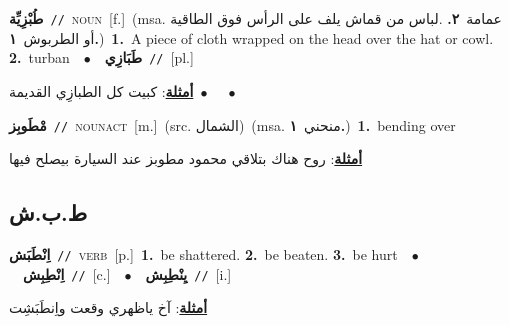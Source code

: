 \documentclass[10pt,a4paper,twoside]{article} %
\begin{document}
\begin{multicols}{2}
{\setlength\topsep{0pt}\textbf{\foreignlanguage{arabic}{طُبْزِيِّة}}\ {\color{gray}\texttt{//}\color{black}}\ \textsc{noun}\ [f.]\ \color{gray}(msa. \foreignlanguage{arabic}{عمامة}~\foreignlanguage{arabic}{\textbf{٢.}}  .\foreignlanguage{arabic}{لباس من قماش يلف على الرأس فوق الطاقية أو الطربوش}~\foreignlanguage{arabic}{\textbf{١.}})\color{black}\ \textbf{1.}~A piece of cloth wrapped on the head over the hat or cowl.  \textbf{2.}~turban\ \ $\bullet$\ \ \setlength\topsep{0pt}\textbf{\foreignlanguage{arabic}{طَبَازِي}}\ {\color{gray}\texttt{//}\color{black}}\ [pl.]\  \begin{flushright}\color{gray}\foreignlanguage{arabic}{\textbf{\underline{\foreignlanguage{arabic}{أمثلة}}}: كبيت كل الطبازِي القديمة\ $\bullet$\ \  \ $\bullet$\ \  }\end{flushright}\color{black}} \vspace{2mm}

{\setlength\topsep{0pt}\textbf{\foreignlanguage{arabic}{مْطَوبِز}}\ {\color{gray}\texttt{//}\color{black}}\ \textsc{noun\textunderscore act}\ [m.]\ (src. \color{gray}\foreignlanguage{arabic}{الشمال}\color{black})\ \color{gray}(msa. \foreignlanguage{arabic}{منحني}~\foreignlanguage{arabic}{\textbf{١.}})\color{black}\ \textbf{1.}~bending over\  \begin{flushright}\color{gray}\foreignlanguage{arabic}{\textbf{\underline{\foreignlanguage{arabic}{أمثلة}}}: روح هناك بتلاقي محمود مطوبز عند السيارة بيصلح فيها}\end{flushright}\color{black}} \vspace{2mm}

\vspace{-3mm}
\subsection*{\color{blue}\foreignlanguage{arabic}{ط.ب.ش}\color{blue}{}} 

{\setlength\topsep{0pt}\textbf{\foreignlanguage{arabic}{اِنْطَبَش}}\ {\color{gray}\texttt{//}\color{black}}\ \textsc{verb}\ [p.]\ \textbf{1.}~be shattered.  \textbf{2.}~be beaten.  \textbf{3.}~be hurt\ \ $\bullet$\ \ \setlength\topsep{0pt}\textbf{\foreignlanguage{arabic}{اِنْطِبِش}}\ {\color{gray}\texttt{//}\color{black}}\ [c.]\ \ $\bullet$\ \ \setlength\topsep{0pt}\textbf{\foreignlanguage{arabic}{يِنْطِبِش}}\ {\color{gray}\texttt{//}\color{black}}\ [i.]\  \begin{flushright}\color{gray}\foreignlanguage{arabic}{\textbf{\underline{\foreignlanguage{arabic}{أمثلة}}}: آخ ياظهري وقعت واِنطَبَشِت}\end{flushright}\color{black}} \vspace{2mm}


\end{multicols}
\end{document}
